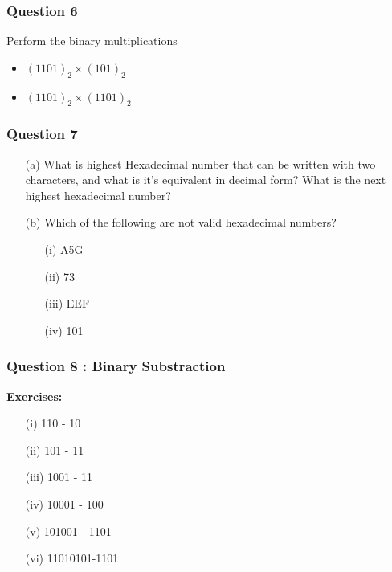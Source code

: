 \documentclass[]{report}
\begin{document}
\subsubsection*{Question 6}

Perform the binary multiplications
\begin{itemize}
\item $(1101)_2 \times (101)_2$
\item $(1101)_2 \times (1101)_2$
\end{itemize}


\subsubsection*{Question 7}
\begin{itemize}


\item[(a)] What is highest Hexadecimal number that can be written with two characters, and what is it's equivalent in decimal form?
What is the next highest hexadecimal number?

\item[(b)] Which of the following are not valid hexadecimal numbers?

\begin{multicols}{2}
\begin{itemize}
\item[(i)] A5G 
\item[(ii)] 73 
\item[(iii)] EEF
\item[(iv)] 101
\end{itemize}
\end{multicols}
\end{itemize}



\subsubsection*{Question 8 : Binary Substraction}
\textbf{Exercises:}

\begin{multicols}{2}
\begin{itemize}
\item[(i)] 110 - 10
\item[(ii)] 101 - 11  
\item[(iii)] 1001 - 11
\item[(iv)] 10001 - 100 
\item[(v)] 101001 - 1101
\item[(vi)] 11010101-1101
\end{itemize}
\end{multicols}
\end{document}
